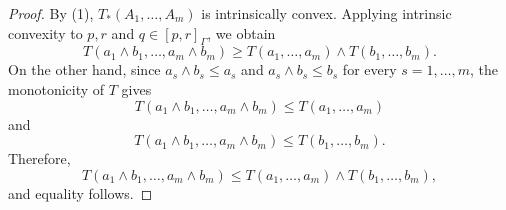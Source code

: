 \documentclass[10pt,a4paper]{amsart}
\begin{document}
\begin{proof}
By (1), \(T_*(A_1,\dots,A_m)\) is intrinsically convex. Applying intrinsic convexity to \(p,r\) and \(q\in[p,r]_{\Gamma}\), we obtain
\[
T(a_1\wedge b_1,\dots,a_m\wedge b_m)
\geq
T(a_1,\dots,a_m)\wedge T(b_1,\dots,b_m).
\]
On the other hand, since \(a_s\wedge b_s\le a_s\) and \(a_s\wedge b_s\le b_s\) for every \(s=1,\dots,m\), the monotonicity of \(T\) gives
\[
T(a_1\wedge b_1,\dots,a_m\wedge b_m)
\leq
T(a_1,\dots,a_m)
\]
and
\[
T(a_1\wedge b_1,\dots,a_m\wedge b_m)
\leq
T(b_1,\dots,b_m).
\]
Therefore,
\[
T(a_1\wedge b_1,\dots,a_m\wedge b_m)
\leq
T(a_1,\dots,a_m)\wedge T(b_1,\dots,b_m),
\]
and equality follows.
\end{proof}
\end{document}
